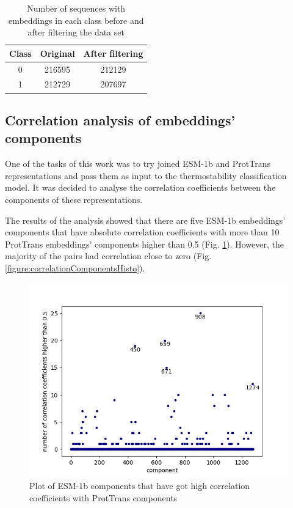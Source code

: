 \documentclass[12pt]{article}
\begin{document}
	\begin{table}[h!]
		\caption{Number of sequences with embeddings in each class 
		before and after filtering the data set}
		\vspace{0.2cm}
		\centering
		\begin{tabular}{ | c | c c | }
			\hline 
			Class & Original & After filtering \\
			\hline 
			0 & 216595 & 212129 \\
			1 & 212729 & 207697 \\
			\hline    
		\end{tabular}
		\label{table:numberEmbeddingsClasses}
	\end{table}

	\newpage
	
	\subsection{Correlation analysis of embeddings' components}

	One of the tasks of this work was to try joined ESM-1b and ProtTrans 
	representations and pass them as input to the thermostability 
	classification model. It was decided to analyse the correlation 
	coefficients between the components of these representations. 

	The results of the analysis showed that there are five ESM-1b
	embeddings' components that have absolute correlation coefficients 
	with more than 10 ProtTrans embeddings' components higher than 0.5 
	(Fig. \ref{figure:highCorrelationComponents}). However, the majority
	of the pairs had correlation close to zero 
	(Fig. \ref{figure:correlationComponentsHisto}).

	\begin{figure}[h!]
		\centering
		\includegraphics[scale=0.85]{validation_small_set_2_joined_correlation_high_corr.png}

		\caption{Plot of ESM-1b components that have got high correlation 
		coefficients with ProtTrans components}
		\label{figure:highCorrelationComponents}
	\end{figure}
\end{document}
